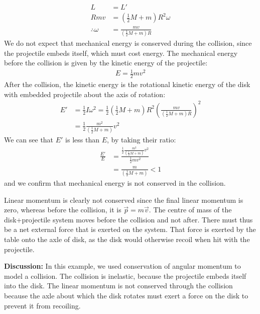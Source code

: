 \begin{example}
\begin{align*}
L &= L'\\
Rmv &= \left(\frac{1}{2}M+m\right)R^2\omega\\
\therefore \omega &= \frac{mv}{\left(\frac{1}{2}M+m\right)R}
\end{align*}
We do not expect that mechanical energy is conserved during the collision, since the projectile embeds itself, which must cost energy. The mechanical energy before the collision is given by the kinetic energy of the projectile:
\begin{align*}
E = \frac{1}{2}mv^2
\end{align*}
After the collision, the kinetic energy is the rotational kinetic energy of the disk with embedded projectile about the axis of rotation:
\begin{align*}
E' &= \frac{1}{2}I\omega^2 = \frac{1}{2} \left(\frac{1}{2}M+m\right)R^2 \left( \frac{mv}{\left(\frac{1}{2}M+m\right)R}\right)^2\\
&= \frac{1}{2} \frac{m^2}{\left(\frac{1}{2}M+m\right)} v^2
\end{align*}
We can see that $E'$ is less than $E$, by taking their ratio:
\begin{align*}
\frac{E'}{E} &= \frac{\frac{1}{2} \frac{m^2}{\left(\frac{1}{2}M+m\right)} v^2}{\frac{1}{2}mv^2}\\
&=\frac{m}{\left(\frac{1}{2}M+m\right)}<1
\end{align*}
and we confirm that mechanical energy is not conserved in the collision.

Linear momentum is clearly not conserved since the final linear momentum is zero, whereas before the collision, it is $\vec p=m\vec v$. The centre of mass of the disk+projectile system moves before the collision and not after. There must thus be a net external force that is exerted on the system. That force is exerted by the table onto the axle of disk, as the disk would otherwise recoil when hit with the projectile.

\textbf{Discussion:} In this example, we used conservation of angular momentum to model a collision. The collision is inelastic, because the projectile embeds itself into the disk. The linear momentum is not conserved through the collision because the axle about which the disk rotates must exert a force on the disk to prevent it from recoiling. 
\end{example}

